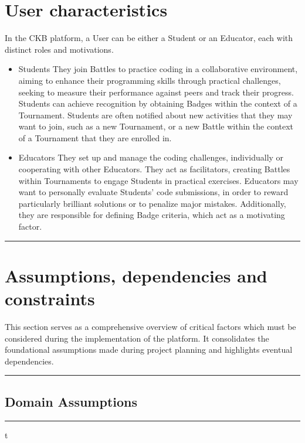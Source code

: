 \documentclass{Configuration_Files/Template}
\begin{document}
\section{User characteristics}

In the CKB platform, a User can be either a Student or an Educator, each with distinct roles and motivations.

\begin{itemize}
\item \textcolor{bluepoli}{Students} They join Battles to practice coding in a collaborative environment, aiming to enhance their programming skills through practical challenges, seeking to measure their performance against peers and track their progress. Students can achieve recognition by obtaining Badges within the context of a Tournament. Students are often notified about new activities that they may want to join, such as a new Tournament, or a new Battle within the context of a Tournament that they are enrolled in.
\item \textcolor{bluepoli}{Educators} They set up and manage the coding challenges, individually or cooperating with other Educators. They act as facilitators, creating Battles within Tournaments to engage Students in practical exercises. Educators may want to personally evaluate Students' code submissions, in order to reward particularly brilliant solutions or to penalize major mistakes. Additionally, they are responsible for defining Badge criteria, which act as a motivating factor.
\end{itemize}

{\color{bluepoli}\rule{\linewidth}{0.1pt}}

\section{Assumptions, dependencies and constraints}

This section serves as a comprehensive overview of critical factors which must be considered during the implementation of the platform. It consolidates the foundational assumptions made during project planning and highlights eventual dependencies.

{\color{bluepoli}\rule{\linewidth}{0.1pt}}

\subsection{Domain Assumptions}

{\color{bluepoli}\rule{\linewidth}{0.1pt}}t
\end{document}
